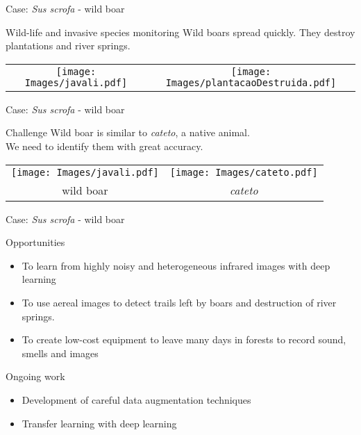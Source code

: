 \documentclass{beamer}
\begin{document}
\begin{frame}{Case: \textit{Sus scrofa} - wild boar}
	\begin{alertblock}{Wild-life and invasive species monitoring}
Wild boars spread quickly. They destroy plantations and river springs.
	\end{alertblock}

  \begin{tabular}{cc}
    \texttt{[image: Images/javali.pdf]} &  \texttt{[image: Images/plantacaoDestruida.pdf]}  \\
  \end{tabular}
\end{frame}


\begin{frame}{Case: \textit{Sus scrofa} - wild boar}
  \begin{block}{Challenge}
    Wild boar is similar to \textit{cateto}, a native animal.\\
We need to identify them with great accuracy.
	\end{block}


    \centering
  \begin{tabular}{cc}
    \texttt{[image: Images/javali.pdf]} & \texttt{[image: Images/cateto.pdf]} \\
     wild boar & \textit{cateto}
  \end{tabular}

\end{frame}

\begin{frame}{Case: \textit{Sus scrofa} - wild boar}
	\begin{exampleblock}{Opportunities}
    \begin{itemize}
      \item To learn from highly noisy and heterogeneous infrared images with deep learning 
      \item To use aereal images to detect trails left by boars and destruction of river springs.
      \item To create low-cost equipment to leave many days in forests to record sound, smells and images
    \end{itemize}
	\end{exampleblock}

  \begin{alertblock}{Ongoing work}
    \begin{itemize}
      \item Development of careful data augmentation techniques
      \item Transfer learning with deep learning
    \end{itemize}
  \end{alertblock}
\end{frame}
\end{document}
